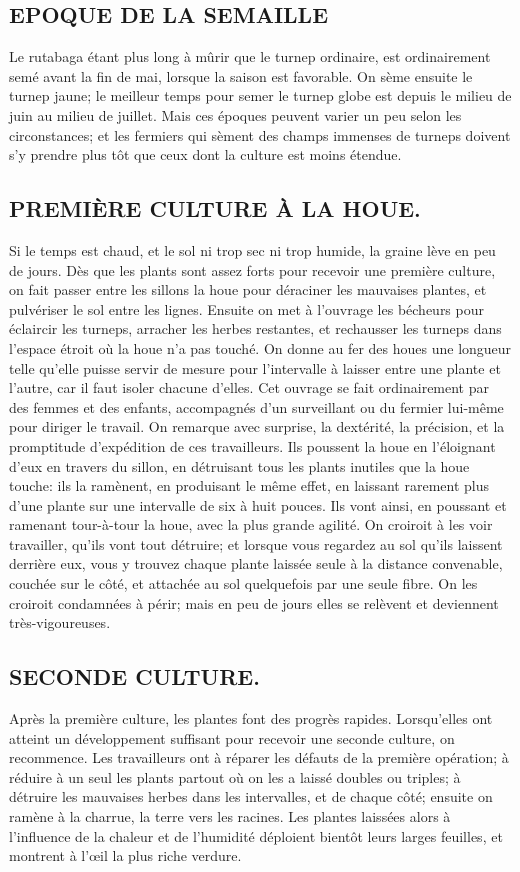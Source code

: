 \subsection{EPOQUE DE LA SEMAILLE}
Le rutabaga étant plus long à mûrir que le turnep ordinaire, est ordinairement semé avant la fin de mai, lorsque la saison est favorable. On sème ensuite le turnep jaune; le meilleur temps pour\setcounter{page}{117} semer le turnep globe est depuis le milieu de juin au milieu de juillet. Mais ces époques peuvent varier un peu selon les circonstances; et les fermiers qui sèment des champs immenses de turneps doivent s'y prendre plus tôt que ceux dont la culture est moins étendue.
\subsection{PREMIÈRE CULTURE À LA HOUE.}
Si le temps est chaud, et le sol ni trop sec ni trop humide, la graine lève en peu de jours. Dès que les plants sont assez forts pour recevoir une première culture, on fait passer entre les sillons la houe pour déraciner les mauvaises plantes, et pulvériser le sol entre les lignes. Ensuite on met à l'ouvrage les bécheurs pour éclaircir les turneps, arracher les herbes restantes, et rechausser les turneps dans l'espace étroit où la houe n'a pas touché. On donne au fer des houes une longueur telle qu'elle puisse servir de mesure pour l'intervalle à laisser entre une plante et l'autre, car il faut isoler chacune d'elles. Cet ouvrage se fait ordinairement par des femmes et des enfants, accompagnés d'un surveillant ou du fermier lui-même pour diriger le travail. On remarque avec surprise, la dextérité, la précision, et la promptitude d'expédition de ces travailleurs. Ils poussent la houe en l'éloignant d'eux en travers du sillon, en détruisant tous\setcounter{page}{118} les plants inutiles que la houe touche: ils la ramènent, en produisant le même effet, en laissant rarement plus d'une plante sur une intervalle de six à huit pouces. Ils vont ainsi, en poussant et ramenant tour-à-tour la houe, avec la plus grande agilité. On croiroit à les voir travailler, qu'ils vont tout détruire; et lorsque vous regardez au sol qu'ils laissent derrière eux, vous y trouvez chaque plante laissée seule à la distance convenable, couchée sur le côté, et attachée au sol quelquefois par une seule fibre. On les croiroit condamnées à périr; mais en peu de jours elles se relèvent et deviennent très-vigoureuses.
\subsection{SECONDE CULTURE.} Après la première culture, les plantes font des progrès rapides. Lorsqu'elles ont atteint un développement suffisant pour recevoir une seconde culture, on recommence. Les travailleurs ont à réparer les défauts de la première opération; à réduire à un seul les plants partout où on les a laissé doubles ou triples; à détruire les mauvaises herbes dans les intervalles, et de chaque côté; ensuite on ramène à la charrue, la terre vers les racines. Les plantes laissées alors à l'influence de la chaleur et de l'humidité déploient bientôt leurs larges feuilles, et montrent à l'œil la plus riche verdure.
